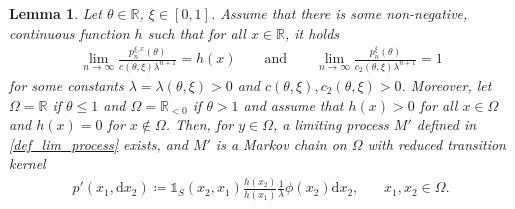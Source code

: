 \documentclass[10pt,a4paper]{amsart}
\newcommand{\R}{\mathbb{R}} %
\newcommand{\1}{\mathds{1}}
\renewcommand{\d}{\mathrm{d}}
\newtheorem{Lemma}[definition]{Lemma}
\begin{document}
\begin{Lemma}\label{Kernel_lim_process}
 Let $\theta\in\R$, $\xi\in[0,1]$. Assume that there is some non-negative, continuous function $h$ such that for all $x\in\R$, it holds
\begin{align}\label{assumption_asymptotics}
   \lim_{n\to\infty}\frac{p_n^{\xi,x}(\theta)}{c(\theta,\xi)\lambda^{n+1}}= h(x) \qquad\text{and}\qquad
        \lim_{n\to\infty}\frac{p_n^{\xi}(\theta)}{c_2(\theta,\xi)\lambda^{n+1}}=1
\end{align}
for some constants $\lambda=\lambda(\theta,\xi)>0$ and $c(\theta,\xi),c_2(\theta,\xi)>0$.
Moreover, let $\Omega=\R$ if $\theta\le 1$ and $\Omega=\R_{<0}$ if $\theta>1$ and assume that $h(x)>0$ for all $x\in\Omega$ and $h(x)=0$ for $x\notin\Omega$. Then, for $y\in\Omega$, a limiting process $M'$ defined in \eqref{def_lim_process}
exists, and $M'$ is a Markov chain on $\Omega$ with reduced transition kernel 
\begin{align} \label{eqn:tkrefk}
    p'(x_1,\d x_2)\coloneqq \mathds{1}_S(x_2,x_{1})\frac{h(x_2)}{h(x_1)}\frac{1}{\lambda}\phi(x_2)\d x_2,~~~~~~~~x_1,x_2\in \Omega.
\end{align}
\end{Lemma}
\end{document}
